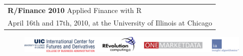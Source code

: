 \documentclass[11pt]{article}
\newcommand{\ra}[1]{\renewcommand{\arraystretch}{#1}}  %
\begin{document}
\thispagestyle{empty}


\ra{1.2} \sf

\begin{tabular}{rlrlp{5in}} %

  \multicolumn{5}{l}{\Huge \textbf{\color{KeynoteTalk} R/Finance 2010} \huge \phantom{i} Applied Finance with R} \\
  \multicolumn{5}{l}{\large \color{Breaks} April 16th and 17th, 2010, at the University of Illinois at Chicago} \\
\end{tabular}

\begin{figure}[h!]
  \centering
    \includegraphics[page=1,scale=0.15]{alllogos}
\end{figure}
\vspace{30pt}
\end{document}
